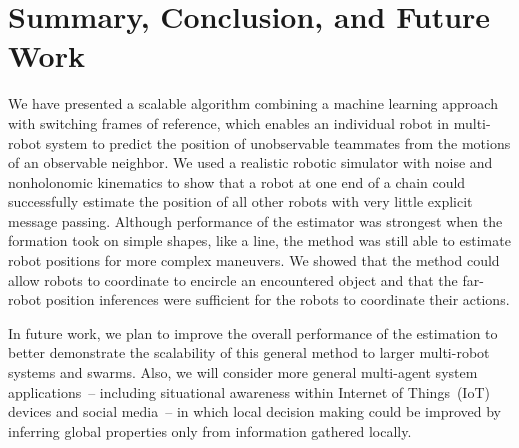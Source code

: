 \documentclass[letterpaper, 10 pt, conference]{ieeeconf}  %
\begin{document}
	\section{Summary, Conclusion, and Future Work}
	\label{sec:conclusion}
	
	We have presented a scalable algorithm combining a machine learning
	approach with switching frames of reference, which enables an individual
	robot in multi-robot system to predict the position of unobservable
	teammates from the motions of an observable neighbor. We used a
	realistic robotic simulator with noise and nonholonomic kinematics to
	show that a robot at one end of a chain could successfully estimate the
	position of all other robots with very little explicit message passing.
	Although performance of the estimator was strongest when the formation
	took on simple shapes, like a line, the method was still able to
	estimate robot positions for more complex maneuvers. We showed that the
	method could allow robots to coordinate to encircle an encountered
	object and that the far-robot position inferences were sufficient for
	the robots to coordinate their actions.
	
	In future work, we plan to improve the overall performance of the
	estimation to better demonstrate the scalability of this general method
	to larger multi-robot systems and swarms. Also, we will consider more
	general multi-agent system applications~-- including situational
	awareness within Internet of Things~(IoT) devices and social media~-- in
	which local decision making could be improved by inferring global
	properties only from information gathered locally.

{\small
	
	
}
\end{document}
